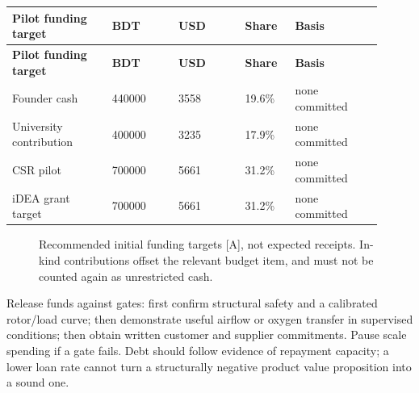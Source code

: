 \documentclass[11pt,a4paper]{article}
\begin{document}
{\small
\setlength{\tabcolsep}{3pt}\renewcommand{\arraystretch}{1.18}
\begin{longtable}{@{}>{\raggedright\arraybackslash}p{0.2438\linewidth}>{\raggedright\arraybackslash}p{0.1625\linewidth}>{\raggedright\arraybackslash}p{0.1625\linewidth}>{\raggedright\arraybackslash}p{0.1219\linewidth}>{\raggedright\arraybackslash}p{0.2194\linewidth}@{}}
\toprule \textbf{Pilot funding target} & \textbf{BDT} & \textbf{USD} & \textbf{Share} & \textbf{Basis} \\ \midrule
\endfirsthead\toprule \textbf{Pilot funding target} & \textbf{BDT} & \textbf{USD} & \textbf{Share} & \textbf{Basis} \\ \midrule
\endhead\bottomrule\endfoot
Founder cash & \num{440000} & \num{3558} & \num{19.6}\% & [A] none committed \\
University contribution & \num{400000} & \num{3235} & \num{17.9}\% & [A] none committed \\
CSR pilot & \num{700000} & \num{5661} & \num{31.2}\% & [A] none committed \\
iDEA grant target & \num{700000} & \num{5661} & \num{31.2}\% & [A] none committed \\
\end{longtable}}
\begin{figure}[htbp]\centering{}\caption{Recommended initial funding targets [A], not expected receipts. In-kind contributions offset the relevant budget item, and must not be counted again as unrestricted cash.}\end{figure}
Release funds against gates: first confirm structural safety and a calibrated rotor/load curve; then demonstrate useful airflow or oxygen transfer in supervised conditions; then obtain written customer and supplier commitments. Pause scale spending if a gate fails. Debt should follow evidence of repayment capacity; a lower loan rate cannot turn a structurally negative product value proposition into a sound one.
\end{document}
